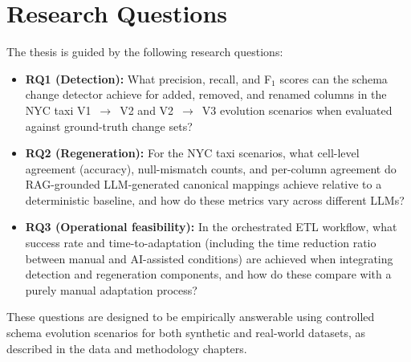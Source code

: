 \section{Research Questions}

The thesis is guided by the following research questions:
%
\begin{itemize}
  \item \textbf{RQ1 (Detection):} What precision, recall, and F\(_1\) scores can the schema change detector achieve for added, removed, and renamed columns in the NYC taxi V1~\(\rightarrow\)~V2 and V2~\(\rightarrow\)~V3 evolution scenarios when evaluated against ground-truth change sets?
  \item \textbf{RQ2 (Regeneration):} For the NYC taxi scenarios, what cell-level agreement (accuracy), null-mismatch counts, and per-column agreement do RAG-grounded LLM-generated canonical mappings achieve relative to a deterministic baseline, and how do these metrics vary across different LLMs?
  \item \textbf{RQ3 (Operational feasibility):} In the orchestrated ETL workflow, what success rate and time-to-adaptation (including the time reduction ratio between manual and AI-assisted conditions) are achieved when integrating detection and regeneration components, and how do these compare with a purely manual adaptation process?
\end{itemize}

These questions are designed to be empirically answerable using controlled
schema evolution scenarios for both synthetic and real-world datasets, as
described in the data and methodology chapters.


